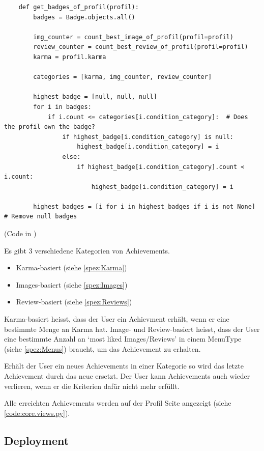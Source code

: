 \begin{lstlisting}
    def get_badges_of_profil(profil):
        badges = Badge.objects.all()
 
        img_counter = count_best_image_of_profil(profil=profil)
        review_counter = count_best_review_of_profil(profil=profil)
        karma = profil.karma

        categories = [karma, img_counter, review_counter]

        highest_badge = [null, null, null]
        for i in badges:
            if i.count <= categories[i.condition_category]:  # Does the profil own the badge?
                if highest_badge[i.condition_category] is null:
                    highest_badge[i.condition_category] = i
                else:
                    if highest_badge[i.condition_category].count < i.count:
                        highest_badge[i.condition_category] = i
        
        highest_badges = [i for i in highest_badges if i is not None]  # Remove null badges
\end{lstlisting}

(Code in )

Es gibt 3 verschiedene Kategorien von Achievements.
\begin{itemize}
    \item Karma-basiert (siehe \ref{spez:Karma})
    \item Images-basiert (siehe \ref{spez:Images})
    \item Review-basiert (siehe \ref{spez:Reviews})
\end{itemize}

Karma-basiert heisst, dass der User ein Achievment erhält, wenn er eine
bestimmte Menge an Karma hat. Image- und Review-basiert heisst, dass der User
eine bestimmte Anzahl an `most liked Images/Reviews' in einem MenuType (siehe
\ref{spez:Menus}) braucht, um das Achievement zu erhalten.

Erhält der User ein neues Achievements in einer Kategorie so wird das letzte
Achievement durch das neue ersetzt. Der User kann Achievements auch wieder
verlieren, wenn er die Kriterien dafür nicht mehr erfüllt.

Alle erreichten Achievements werden auf der Profil Seite angezeigt (siehe
\ref{code:core.views.py}).


\subsection{Deployment}\label{spez:Deployment}

